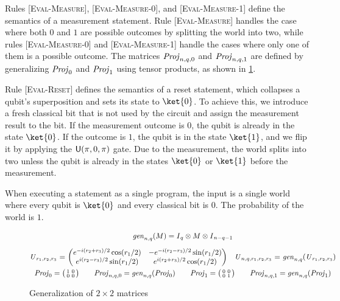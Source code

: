 Rules [\textsc{Eval-Measure}], [\textsc{Eval-Measure-0}], and
	[\textsc{Eval-Measure-1}] define the semantics of a measurement statement.
%
Rule [\textsc{Eval-Measure}] handles the case where both $0$ and $1$ are
possible outcomes by splitting the world into two, while rules
	[\textsc{Eval-Measure-0}] and [\textsc{Eval-Measure-1}] handle the cases where
only one of them is a possible outcome.
%
The matrices $\mbox{\emph{Proj}}_{n,q,0}$ and $\mbox{\emph{Proj}}_{n,q,1}$ are defined by generalizing
$\mbox{\emph{Proj}}_{0}$ and $\mbox{\emph{Proj}}_{1}$ using tensor products, as shown in
\cref{fig:gen22}.

Rule [\textsc{Eval-Reset}] defines the semantics of a reset statement, which
collapses a qubit's superposition and sets its state to $\ket{0}$.
%
To achieve this, we introduce a fresh classical bit that is not used by the
circuit and assign the measurement result to the bit.
%
If the measurement outcome is $0$, the qubit is already in the state $\ket{0}$.
%
If the outcome is $1$, the qubit is in the state $\ket{1}$, and we flip it by
applying the $\mathsf{U}(\pi,0,\pi)$ gate.
%
Due to the measurement, the world splits into two unless the qubit is already
in the states $\ket{0}$ or $\ket{1}$ before the measurement.

When executing a statement as a single program, the input is a single world
where every qubit is $\ket{0}$ and every classical bit is $0$. The probability
of the world is $1$.

\begin{figure}[t]
	\[
		\begin{array}{@{}r@{~}c@{~}l@{\quad}r@{~}c@{~}l@{}}
			\multicolumn{6}{c}{
				\generalize{n,q}{M}=\identity{q}\otimes{M}\otimes\identity{n-q-1}
			}                                                                          \\[1em]
			\mrotate{r_1,r_2,r_3}        & = &
			\mtrx{
			e^{-i(r_2+r_3)/2}\cos(r_1/2) &
			-e^{-i(r_2-r_3)/2}\sin(r_1/2)                                              \\
			e^{i(r_2-r_3)/2}\sin(r_1/2)  &
			e^{i(r_2+r_3)/2}\cos(r_1/2)
			}
			                             &
			\mrotate{n,q,r_1,r_2,r_3}    & = & \generalize{n,q}{\mrotate{r_1,r_2,r_3}}
			\\[1em]
			\multicolumn{6}{c}{
			\mproj{0}=\smtrx{1           & 0                                           \\0                  & 0} \qquad
				  \mproj{n,q,0}=\generalize{n,q}{\mproj{0}} \qquad
			\mproj{1}=\smtrx{0           & 0                                           \\0 & 1} \qquad
				  \mproj{n,q,1}=\generalize{n,q}{\mproj{1}}
			}
		\end{array}
	\]
	\caption{Generalization of $2\times2$ matrices}
	\label{fig:gen22}
\end{figure}

